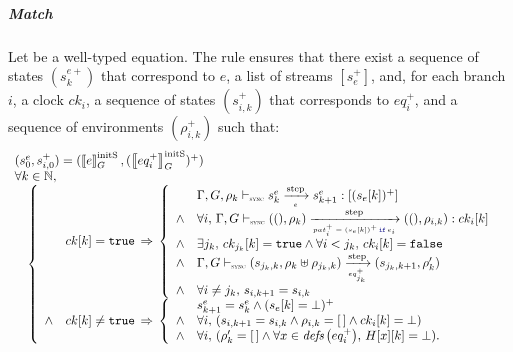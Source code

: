 \begin{skippableproof}
    \subparagraph{Match}
    Let  be a well-typed  equation. The
    rule  ensures that there exist
    a sequence of states $(s_k^{e+})$ that correspond to $e$,
    a list of streams $[s_e^+]$, and,
    for each branch $i$, a clock $ck_i$, a sequence of states $(s_{i, k}^+)$ that corresponds to
    $eq_i^+$, and a sequence of environments $(\rho_{i, k}^+)$ such that:
    \begin{equation*}
        \begin{array}{ll}
            (s^e_0, s_{i, 0}^+) = (\initstate{e}, (\initstate{eq_i^+})^+) \\
            \forall k \in \N,                                             \\
            \quad \left\{
            \begin{array}{ll}
                       & ck[k] = \true \, \Rightarrow \,
                \left\{
                \begin{array}{ll}
                           & \exprOpsem{\rho_k}{s^e_k}{e}{s^e_{k+1}}{(s_e[k])^+}                                        \\
                    \wedge & \forall i, \, \patOpsem{\rho_k}{\guarded{pat_i^+ = (s_e[k])^+}{e_i}}{ck_i[k]}{\rho_{i, k}} \\
                    \wedge & \exists j_k, \, ck_{j_k}[k] = \true \wedge \forall i < j_k, \, ck_i[k] = \false            \\
                    \wedge & \eqOpsem{\rho_k \ctxconcat \rho_{j_k, k}}{s_{j_k, k}}{eq_{j_k}^+}{s_{j_k, k+1}}{\rho'_k}   \\
                    \wedge & \forall i \neq j_k, \, s_{i, k+1} = s_{i, k}                                               \\
                \end{array}
                \right.                                     \\
                \wedge & ck[k] \neq \true \, \Rightarrow \,
                \left\{
                \begin{array}{ll}
                           & s^e_{k+1} = s^e_k \wedge (s_e[k] = \bot)^+                                                 \\
                    \wedge & \forall i, \, (s_{i, k+1} = s_{i, k} \wedge \rho_{i, k} = \emptyrho \wedge ck_i[k] = \bot) \\
                    \wedge & \forall i, \, (\rho'_k = \emptyrho \wedge \forall x \in \defs{eq_i^+}, \, H[x][k] = \bot). \\
                \end{array}
                \right.                                     \\
            \end{array}
            \right.
        \end{array}
    \end{equation*}


\end{skippableproof}
